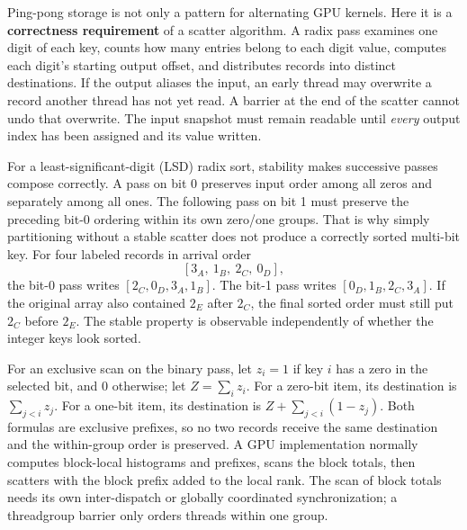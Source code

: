 Ping-pong storage is not only a pattern for alternating GPU kernels. Here it is a \textbf{correctness requirement} of a scatter algorithm. A radix pass examines one digit of each key, counts how many entries belong to each digit value, computes each digit's starting output offset, and distributes records into distinct destinations. If the output aliases the input, an early thread may overwrite a record another thread has not yet read. A barrier at the end of the scatter cannot undo that overwrite. The input snapshot must remain readable until \emph{every} output index has been assigned and its value written.

For a least-significant-digit (LSD) radix sort, stability makes successive passes compose correctly. A pass on bit 0 preserves input order among all zeros and separately among all ones. The following pass on bit 1 must preserve the preceding bit-0 ordering within its own zero/one groups. That is why simply partitioning without a stable scatter does not produce a correctly sorted multi-bit key. For four labeled records in arrival order \[
[3_A,\ 1_B,\ 2_C,\ 0_D],
\] the bit-0 pass writes \([2_C,0_D,3_A,1_B]\). The bit-1 pass writes \([0_D,1_B,2_C,3_A]\). If the original array also contained \(2_E\) after \(2_C\), the final sorted order must still put \(2_C\) before \(2_E\). The stable property is observable independently of whether the integer keys look sorted.

For an exclusive scan on the binary pass, let \(z_i=1\) if key \(i\) has a zero in the selected bit, and \(0\) otherwise; let \(Z=\sum_i z_i\). For a zero-bit item, its destination is \(\sum_{j<i}z_j\). For a one-bit item, its destination is \(Z+\sum_{j<i}(1-z_j)\). Both formulas are exclusive prefixes, so no two records receive the same destination and the within-group order is preserved. A GPU implementation normally computes block-local histograms and prefixes, scans the block totals, then scatters with the block prefix added to the local rank. The scan of block totals needs its own inter-dispatch or globally coordinated synchronization; a threadgroup barrier only orders threads within one group.

